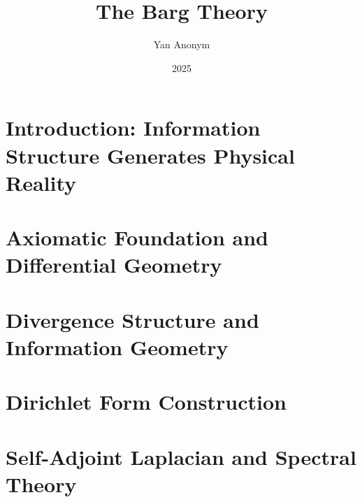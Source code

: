 \documentclass[12pt,a4paper]{article}
\title{The Barg Theory}
\author{Yan Anonym}
\date{2025}
\begin{document}
\maketitle

\tableofcontents
\clearpage

\newpage
\section{Introduction: Information Structure Generates Physical Reality}
\label{sec:introduction}







\newpage
\section{Axiomatic Foundation and Differential Geometry}
\label{sec:axiomaticFoundation}











\newpage
\section{Divergence Structure and Information Geometry}
\label{sec:divergenceStructure}






\newpage
\section{Dirichlet Form Construction}
\label{sec:dirichletFormTheory}





\newpage
\section{Self-Adjoint Laplacian and Spectral Theory}
\label{sec:spectralOperatorTheory}
\end{document}
